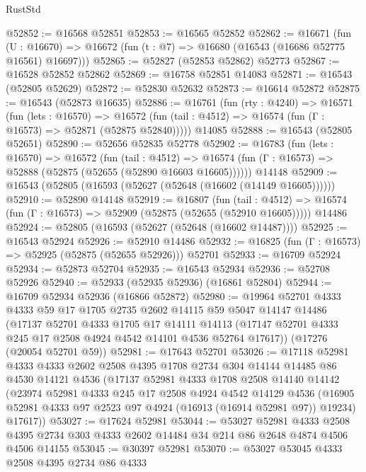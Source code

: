 \begin{lexlean}{RustStd}
\begin{coremodule}
@52852 := @16568 @52851
@52853 := @16565 @52852
@52862 := @16671
    (fun (U : @16670) => @16672 (fun (t : @7) => @16680 (@16543 (@16686 @52775 @16561) @16697)))
@52865 := @52827 (@52853 @52862) @52773
@52867 := @16528 @52852 @52862
@52869 := @16758 @52851 @14083
@52871 := @16543 (@52805 @52629)
@52872 := @52830 @52632
@52873 := @16614 @52872
@52875 := @16543 (@52873 @16635)
@52886 := @16761
    (fun (rty : @4240) =>
    @16571
      (fun (lets : @16570) =>
      @16572 (fun (tail : @4512) => @16574 (fun (Γ : @16573) => @52871 (@52875 @52840)))))
    @14085
@52888 := @16543 (@52805 @52651)
@52890 := @52656 @52835 @52778
@52902 := @16783
    (fun (lets : @16570) =>
    @16572
      (fun (tail : @4512) =>
      @16574 (fun (Γ : @16573) => @52888 (@52875 (@52655 (@52890 @16603 @16605))))))
    @14148
@52909 := @16543 (@52805 (@16593 (@52627 (@52648 (@16602 (@14149 @16605))))))
@52910 := @52890 @14148
@52919 := @16807
    (fun (tail : @4512) => @16574 (fun (Γ : @16573) => @52909 (@52875 (@52655 (@52910 @16605)))))
    @14486
@52924 := @52805 (@16593 (@52627 (@52648 (@16602 @14487))))
@52925 := @16543 @52924
@52926 := @52910 @14486
@52932 := @16825 (fun (Γ : @16573) => @52925 (@52875 (@52655 @52926))) @52701
@52933 := @16709 @52924
@52934 := @52873 @52704
@52935 := @16543 @52934
@52936 := @52708 @52926
@52940 := @52933 (@52935 @52936) (@16861 @52804)
@52944 := @16709 @52934 @52936 (@16866 @52872)
@52980 := @19964
    @52701
    @4333
    @4333
    @59
    @17
    @1705
    @2735
    @2602
    @14115
    @59
    @5047
    @14147
    @14486
    (@17137
      @52701
      @4333
      @1705
      @17
      @14111
      @14113
      (@17147 @52701 @4333 @245 @17 @2508 @4924 @4542 @14101 @4536 @52764 @17617))
    (@17276 (@20054 @52701 @59))
@52981 := @17643 @52701
@53026 := @17118
    @52981
    @4333
    @4333
    @2602
    @2508
    @4395
    @1708
    @2734
    @304
    @14144
    @14485
    @86
    @4530
    @14121
    @4536
    (@17137
      @52981
      @4333
      @1708
      @2508
      @14140
      @14142
      (@23974
        @52981
        @4333
        @245
        @17
        @2508
        @4924
        @4542
        @14129
        @4536
        (@16905 @52981 @4333 @97 @2523 @97 @4924 (@16913 (@16914 @52981 @97)) @19234)
        @17617))
@53027 := @17624 @52981
@53044 := @53027
    @52981
    @4333
    @2508
    @4395
    @2734
    @303
    @4333
    @2602
    @14484
    @34
    @214
    @86
    @2648
    @4874
    @4506
    @4506
    @14155
@53045 := @30397 @52981
@53070 := @53027
    @53045
    @4333
    @2508
    @4395
    @2734
    @86
    @4333

\end{coremodule}
\end{lexlean}
